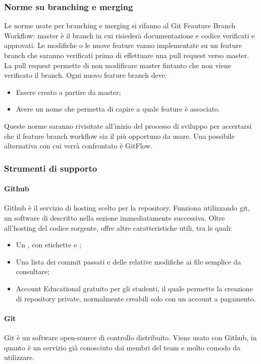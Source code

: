 \subsubsection{Norme su branching e merging}
Le norme usate per branching e merging si rifanno al Git Feauture Branch Workflow:
master è il branch in cui risiederà documentazione e codice verificati e approvati.
Le modifiche o le nuove feature vanno implementate su un feature branch che saranno verificati
prima di effettuare una pull request verso master.
La pull request permette di non modificare master fintanto che non viene verificato il branch.
Ogni nuovo feature branch deve:
\begin{itemize}
\item Essere creato a partire da master;
\item Avere un nome che permetta di capire a quale feature è associato.
\end{itemize}
Queste norme saranno rivisitate all'inizio del processo di sviluppo per accertarsi che il feature branch workflow sia il più opportuno da usare. Una possibile alternativa con cui verrà confrontato è GitFlow.

\subsubsection{Strumenti di supporto}
\paragraph{Github}\Spazio
Github è il servizio di hosting scelto per la repository. Funziona utilizzando git, un software di  descritto nella sezione immediatamente successiva. Oltre all'hosting del codice sorgente, offre altre caratteristiche utili, tra le quali:
\begin{itemize}
\item Un , con etichette e ;
\item Una lista dei commit passati e delle relative modifiche ai file semplice da consultare;
\item Account Educational gratuito per gli studenti, il quale permette la creazione di repository private, normalmente creabili solo con un account a pagamento.
\end{itemize}

\paragraph{Git}\Spazio
Git è un software open-source di controllo  distribuito.
Viene usato con Github, in quanto è un servizio già conosciuto dai membri del team e molto comodo da utilizzare.

